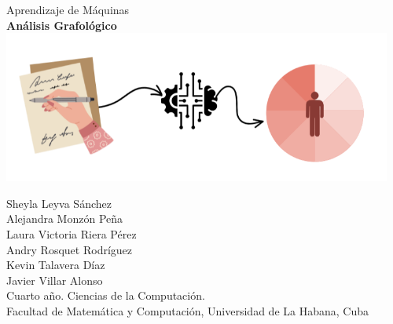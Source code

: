 \documentclass[10pt, a4paper]{article}
\begin{document}
    \begin{center}
    	\large Aprendizaje de M\'aquinas	\\
    	\huge \textbf{An\'alisis Grafol\'ogico} \\
    	
    	\includegraphics[height=5cm]{logo1.png}
    	
    	\normalsize Sheyla Leyva S\'anchez \\  Alejandra Monz\'on Pe\~na \\ Laura Victoria Riera P\'erez \\ Andry Rosquet Rodr\'iguez \\ Kevin Talavera D\'iaz \\ Javier Villar Alonso \\
    	
    	\vspace{1em}
    	\small Cuarto a\~no. Ciencias de la Computaci\'on. \\
   		\small Facultad de Matem\'atica y Computaci\'on, Universidad de La Habana, Cuba 
    \end{center}
	
	\vspace{0.05em}
	\normalsize
    \begin{abstract}
        La grafología es una técnica que estudia las características psicológicas de las personas a través de su escritura. 
        En algunos centros laborales se utilizan este tipo de análisis para determinar cuando contratar o no a alguien y se emplea también para analizar a criminales y en el proceso de determinar trastornos en personas. Esta es una tarea complicada realizada por expertos, psicólogos y grafólogos, y sus resultados están, numerosas veces, sujetos a la perspectiva de quien los analiza. 
        En este trabajo se propone utilizar algoritmos de Aprendizaje de Máquina, para automáticamente poder predecir características psicológicas de un individuo a partir de un fragmento de su escritura. 
        Con este objetivo se propone la creaci\'on de una base de datos de im\'agenes de escritura a mano, as\'i como su uso para entrenar y comparar los modelos para predecir la personalidad basado en el Test de los Cinco Grandes (Big Five).
        Se implementaron los algoritmos Convolutional Neural Network (CNN), Support Vector Machine (SVM), K-Nearest Neighbours (KNN) y K-Means, estableciendo una comparaci\'on de los resultados obtenidos para el an\'alisis grafol\'ogico. 
    \end{abstract}
    
\end{document}

